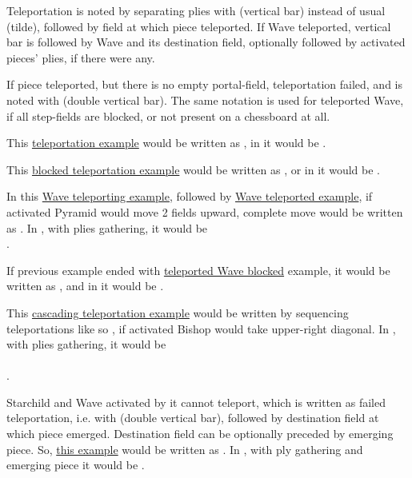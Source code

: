 Teleportation is noted by separating plies with \alg{|} (vertical bar) instead of usual \alg{\~{}} (tilde),
followed by field at which piece teleported. If Wave teleported, vertical bar is followed by Wave and its
destination field, optionally followed by activated pieces' plies, if there were any.

If piece teleported, but there is no empty portal-field, teleportation failed, and is noted with \alg{||}
(double vertical bar). The same notation is used for teleported Wave, if all step-fields are blocked, or
not present on a chessboard at all.

This \hyperref[fig:scn_n_02_teleport_init]{teleportation example} would be written as , in
 it would be .

This \hyperref[fig:scn_n_03_teleport_move_2]{blocked teleportation example} would be written as ,
or in  it would be .

In this \hyperref[fig:scn_n_04_teleport_move_3]{Wave teleporting example}, followed by
\hyperref[fig:scn_n_05_teleport_end]{Wave teleported example}, if activated Pyramid would move 2 fields upward,
complete move would be written as . In , with plies gathering, it would
be \\
\alg{[Gi11-g15]\~{}[Wg15-a18]|[Wr1-l4]\~{}[Al4-l6]}.

If previous example ended with \hyperref[fig:scn_n_06_teleport_wave_blocked]{teleported Wave blocked} example,
it would be written as , and in  it would be \alg{[Gi11-g15]\~{}[Wg15-a18]||}.

This \hyperref[fig:scn_d_13_teleporting_wave_cascade]{cascading teleportation example} would be written by
sequencing teleportations like so , if activated Bishop would take upper-right
diagonal. In , with plies gathering, it would be \\
\alg{[Gj6-h2]\~{}[Wh2-b4]|[Wm18-a24]|[Wx1-r4]\~{}}\\
\alg{[Br4-t6]}.

Starchild and Wave activated by it cannot teleport, which is written as failed teleportation, i.e. with \alg{||}
(double vertical bar), followed by destination field at which piece emerged. Destination field can be optionally
preceded by emerging piece. So,
\hyperref[fig:scn_o_08_starchild_not_moving_monolith_init]{this example} would be written as .
In , with ply gathering and emerging piece it would be .

